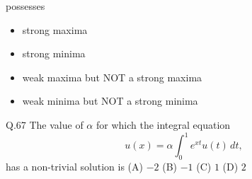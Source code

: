 \documentclass{article}
\begin{document}
																																																																																																									   possesses
																																																																																																									   \begin{itemize}
																																																																																																									       \item[(A)] strong maxima
																																																																																																									           \item[(B)] strong minima
																																																																																																										       \item[(C)] weak maxima but NOT a strong maxima
																																																																																																										           \item[(D)] weak minima but NOT a strong minima
																																																																																																											   \end{itemize}

																																																																																																											   \bigskip

																																																																																																											   Q.67 \quad The value of $\alpha$ for which the integral equation
																																																																																																											   \[
																																																																																																											   u(x) = \alpha \int_0^1 e^{xt} u(t)\,dt,
																																																																																																											   \]
																																																																																																											   has a non-trivial solution is
																																																																																																											   \newline
																																																																																																											   (A) $-2$ \hspace{2cm} (B) $-1$ \hspace{2cm} (C) $1$ \hspace{2cm} (D) $2$
																																																																																																											   \vspace{1em} \newline
\end{document}
